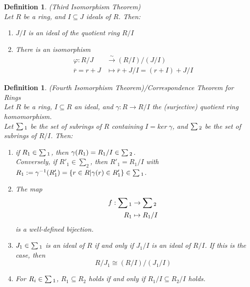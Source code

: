\documentclass[a4paper,8pt]{article}
\theoremstyle{theorem}
\newtheorem{definition}[theorem]{Definition}
\begin{document}
\begin{definition}
\textit{{\color{blue} (Third Isomorphism Theorem)}}\\
Let $R$ be a ring, and $I \subseteq J$ ideals of $R$. Then: 
\begin{enumerate}[label=(\roman*)]
\item $J/I$ is an ideal of the quotient ring $R/I$
\item There is an isomorphism
\begin{align}
\varphi: R/J &\xrightarrow{\sim} (R/I)/(J/I) \nonumber \\
\overline{r}=r+J &\mapsto \overline{r} + J/I = (r+I) + J/I \nonumber
\end{align}
\end{enumerate}
\end{definition}


\begin{definition}
\textit{{\color{blue} (Fourth Isomorphism Theorem)}}/Correspondence Theorem for Rings\\
Let $R$ be a ring, $I \subseteq R$ an ideal, and $\gamma: R \rightarrow R/I$ the (surjective) quotient ring homomorphism.\\
Let $\sum \textsubscript{1}$ be the set of subrings of $R$ containing $I = ker \ \gamma$, and $\sum \textsubscript{2}$ be the set of subrings of $R/I$. Then:
\begin{enumerate}[label=(\roman*)]
\item if $R_1 \in \sum \textsubscript{1}$, then $\gamma(R_1) = R_1/I \in \sum \textsubscript{2}$. \\
Conversely, if $R'_1 \in \sum_2$, then $R'_1 = R_1/I$ with $R_1:=\gamma^{-1}(R'_1) = \{r\in R | \gamma(r) \in R'_1\} \in \sum \textsubscript{1}$.
\item The map 
\begin{align}
f: \sum \textsubscript{1} &\rightarrow \sum \textsubscript{2} \nonumber \\
R_1 &\mapsto R_1/I \nonumber
\end{align}
is a well-defined bijection.
\item $J_1 \in \sum \textsubscript{1}$ is an ideal of $R$ if and only if $J_1/I$ is an ideal of $R/I$. If this is the case, then 
\begin{equation}
R/J_1 \cong (R/I)/(J_1/I) \nonumber
\end{equation} 
\item For $R_i \in \sum \textsubscript{1}$, $R_1 \subseteq R_2$ holds if and only if $R_1/I \subseteq R_2/I$ holds.
\end{enumerate}
\end{definition}
\end{document}
